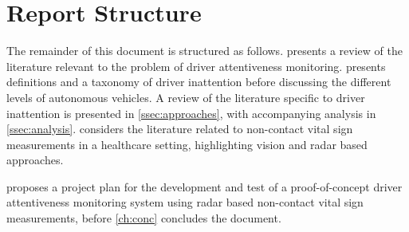 \documentclass[11pt, parskip=half*,twoside=false]{scrbook}
\begin{document}
\section{Report Structure} \label{sec:struct}
The remainder of this document is structured as follows.  presents a review of the literature relevant to the problem of driver attentiveness monitoring.  presents definitions and a taxonomy of driver inattention before discussing the different levels of autonomous vehicles. A review of the literature specific to driver inattention is presented in \cref{ssec:approaches}, with accompanying analysis in \cref{ssec:analysis}.   considers the literature related to non-contact vital sign measurements in a healthcare setting, highlighting vision and radar based approaches.  

 proposes a project plan for the development and test of a proof-of-concept driver attentiveness monitoring system using radar based non-contact vital sign measurements, before \cref{ch:conc} concludes the document.
\end{document}
